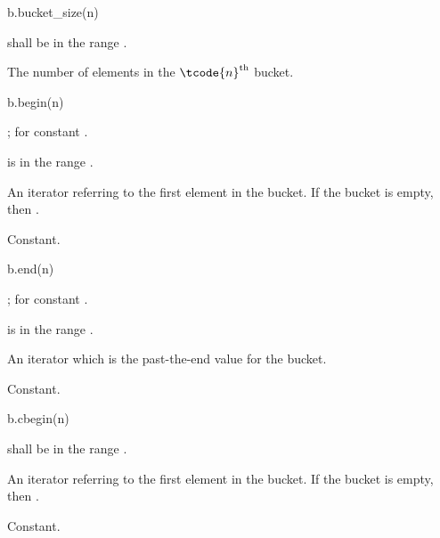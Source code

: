 %
\begin{itemdecl}
b.bucket_size(n)
\end{itemdecl}

\begin{itemdescr}
\pnum
\result
{}

\pnum
\expects
{} shall be in the range .

\pnum
\returns
The number of elements in the $\tcode{n}^\text{th}$ bucket.

\pnum
\complexity
{}
\end{itemdescr}

%
\begin{itemdecl}
b.begin(n)
\end{itemdecl}

\begin{itemdescr}
\pnum
\result
{};  for constant .

\pnum
\expects
{} is in the range .

\pnum
\returns
An iterator referring to the first element in the bucket.
If the bucket is empty, then .

\pnum
\complexity
Constant.
\end{itemdescr}

%
\begin{itemdecl}
b.end(n)
\end{itemdecl}

\begin{itemdescr}
\pnum
\result
{};  for constant .

\pnum
\expects
{} is in the range .

\pnum
\returns
An iterator which is the past-the-end value for the bucket.

\pnum
\complexity
Constant.
\end{itemdescr}

%
\begin{itemdecl}
b.cbegin(n)
\end{itemdecl}

\begin{itemdescr}
\pnum
\result
{}

\pnum
\expects
{} shall be in the range .

\pnum
\returns
An iterator referring to the first element in the bucket.
If the bucket is empty, then .

\pnum
\complexity
Constant.
\end{itemdescr}

